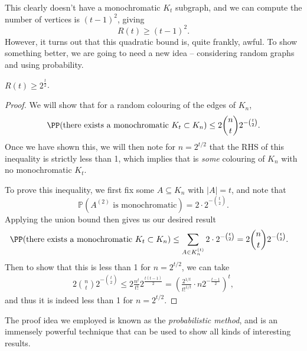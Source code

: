 \documentclass[a4paper]{scrartcl}
\begin{document}
\begin{center}

\end{center}

This clearly doesn't have a monochromatic $K_t$ subgraph, and we can compute the number of vertices is $(t - 1)^2$, giving
$$
R(t) \geq (t - 1)^2.
$$
However, it turns out that this quadratic bound is, quite frankly, awful. To show something better, we are going to need a new idea -- considering random graphs and using probability.

\begin{theorem}[Erdős]
	$R(t) \geq 2^{\frac t2}$.
\end{theorem}
\begin{proof}
	We will show that for a random colouring of the edges of $K_n$,
	$$
	\PP(\text{there exists a monochromatic $K_t \subset K_n$}) \leq 2 \binom{n}{t} 2^{-\binom{t}{2}}.
	$$
	Once we have shown this, we will then note for $n = 2^{t/2}$ that the RHS of this inequality is strictly less than 1, which implies that is \emph{some} colouring of $K_n$ with no monochromatic $K_t$.

	To prove this inequality, we first fix some $A \subseteq K_n$ with $|A| = t$, and note that
	$$
\mathbb{P}(A^{(2)}\text{ is monochromatic}) = 2 \cdot 2^{-\binom{t}{2}}.
	$$
	Applying the union bound then gives us our desired result
	\begin{align*}
		\PP(\text{there exists a monochromatic $K_t \subset K_n$}) &\leq \sum_{A \in K_n^{(t)}} 2 \cdot 2^{-\binom{t}{2}} = 2 \binom{n}{t} 2^{-\binom{t}{2}}.
	\end{align*}
	Then to show that this is less than 1 for $n = 2^{t/2}$, we can take
	\begin{align*}
		2 \binom{n}{t} 2^{-\binom{t}{2}} \leq 2 \frac{n^t}{t!}2^{\frac{t(t-1)}{2}} = \left(\frac{2^{1/t}}{t!^{1/t}} \cdot n 2^{-\frac{t - 1}{2}}\right)^t,
	\end{align*}
	and thus it is indeed less than 1 for $n = 2^{t/2}$.
\end{proof}

The proof idea we employed is known as the \emph{probabilistic method}, and is an immensely powerful technique that can be used to show all kinds of interesting results.
\end{document}
